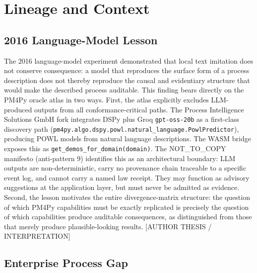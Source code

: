 
\section{Lineage and Context}
\label{sec:sources-pm4py-lineage}

\subsection{2016 Language-Model Lesson}
\label{sec:sources-pm4py-lineage-2016}

The 2016 language-model experiment demonstrated that local text imitation does not conserve
consequence: a model that reproduces the surface form of a process description does not
thereby reproduce the causal and evidentiary structure that would make the described process
auditable. This finding bears directly on the PM4Py oracle atlas in two ways. First, the
atlas explicitly excludes LLM-produced outputs from all conformance-critical paths. The
Process Intelligence Solutions GmbH fork integrates DSPy plus Groq \texttt{gpt-oss-20b}
as a first-class discovery path (\texttt{pm4py.algo.dspy.powl.natural\_language.PowlPredictor}),
producing POWL models from natural language descriptions. The WASM bridge exposes this as
\texttt{get\_demos\_for\_domain(domain)}. The NOT\_TO\_COPY manifesto (anti-pattern 9)
identifies this as an architectural boundary: LLM outputs are non-deterministic, carry no
provenance chain traceable to a specific event log, and cannot carry a named law receipt.
They may function as advisory suggestions at the application layer, but must never be
admitted as evidence. Second, the lesson motivates the entire divergence-matrix structure:
the question of which PM4Py capabilities must be exactly replicated is precisely the
question of which capabilities produce auditable consequences, as distinguished from those
that merely produce plausible-looking results. [AUTHOR THESIS / INTERPRETATION]

\subsection{Enterprise Process Gap}
\label{sec:sources-pm4py-lineage-enterprise}

